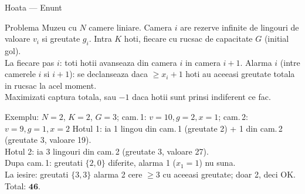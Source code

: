 ﻿\documentclass[9pt]{beamer}
\begin{document}
\begin{frame}[shrink]{Hoata --- Enunt}
  \begin{block}{Problema}
    Muzeu cu $N$ camere liniare. Camera $i$ are rezerve infinite de lingouri de valoare $v_i$
    si greutate $g_i$. Intra $K$ hoti, fiecare cu rucsac de capacitate $G$ (initial gol).\\
    \smallskip
    La fiecare pas $i$: toti hotii avanseaza din camera $i$ in camera $i+1$.
    Alarma $i$ (intre camerele $i$ si $i+1$): se declanseaza daca $\geq x_i+1$ hoti
    au \alert{aceeasi greutate totala} in rucsac la acel moment.\\
    \smallskip
    Maximizati captura totala, sau $-1$ daca hotii sunt prinsi indiferent ce fac.
  \end{block}
  \begin{exampleblock}{Exemplu: $N=2$, $K=2$, $G=3$; cam.\,1: $v=10,g=2,x=1$; cam.\,2: $v=9,g=1,x=2$}
    \footnotesize
    Hotul 1: ia 1 lingou din cam.\,1 (greutate 2) + 1 din cam.\,2 (greutate 3, valoare 19).\\
    Hotul 2: ia 3 lingouri din cam.\,2 (greutate 3, valoare 27).\\
    Dupa cam.\,1: greutati $\{2, 0\}$ \textemdash{} diferite, alarma 1 ($x_1=1$) nu suna.\\
    La iesire: greutati $\{3, 3\}$ \textemdash{} alarma 2 cere $\geq 3$ cu aceeasi greutate; doar 2, deci OK.\\
    Total: $\mathbf{46}$.
  \end{exampleblock}
\end{frame}
\end{document}

